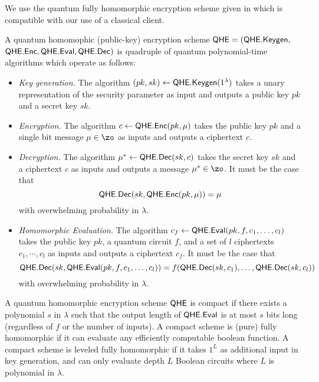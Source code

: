 We use the quantum fully homomorphic encryption scheme given in \cite{mahadev_qfhe} which is compatible with our use of a classical client.
\begin{definition}
	A quantum homomophic (public-key) encryption scheme $\mathsf{QHE}=(\mathsf{QHE.Keygen},$ \linebreak
	$\mathsf{QHE.Enc}, \mathsf{QHE.Eval}, \mathsf{QHE.Dec})$ is quadruple of quantum polynomial-time algorithms which operate as follows:
	\begin{itemize}
		\item \emph{Key generation.}
			The algorithm $(pk, sk)\leftarrow\mathsf{QHE.Keygen}(1^\lambda)$ takes a unary representation of the security parameter as input and outputs a public key $pk$ and a secret key $sk$.
		\item \emph{Encryption.}
			The algorithm $c\leftarrow\mathsf{QHE.Enc}(pk, \mu)$ takes the public key $pk$ and a single bit message $\mu\in\zo$ as inputs and outputs a ciphertext $c$.
		\item \emph{Decryption.}
			The algorithm $\mu^*\leftarrow\mathsf{QHE.Dec}(sk, c)$ takes the secret key $sk$ and a ciphertext $c$ as inputs and outputs a message $\mu^*\in\zo$.
			It must be the case that
				$$\mathsf{QHE.Dec}(sk, \mathsf{QHE.Enc}(pk, \mu))=\mu$$
			with overwhelming probability in $\lambda$.
		\item \emph{Homomorphic Evaluation.}
			The algorithm $c_f\leftarrow\mathsf{QHE.Eval}(pk, f, c_1, \ldots, c_l)$ takes the public key $pk$, a quantum circuit $f$, and a set of $l$ ciphertexts $c_1,\cdots,c_l$ as inputs and outputs a ciphertext $c_f$.
			It must be the case that
				$$\mathsf{QHE.Dec}(sk, \mathsf{QHE.Eval}(pk, f, c_1, \ldots, c_l))=f(\mathsf{QHE.Dec}(sk, c_1),\ldots,\mathsf{QHE.Dec}(sk, c_l))$$
			with overwhelming probability in $\lambda$.
	\end{itemize}
\end{definition}

\begin{definition}
	A quantum homomorphic encryption scheme $\mathsf{QHE}$ is compact if
	there exists a polynomial $s$ in $\lambda$ such that the output length of $\mathsf{QHE.Eval}$ is at most $s$ bits long (regardless of $f$ or
	the number of inputs). A compact scheme is (pure) fully homomorphic if it can evaluate any efficiently computable
	boolean function. A compact scheme is leveled fully homomorphic if it takes $1^L$ as additional input in key generation,
	and can only evaluate depth $L$ Boolean circuits where $L$ is polynomial in $\lambda$.
\end{definition}


